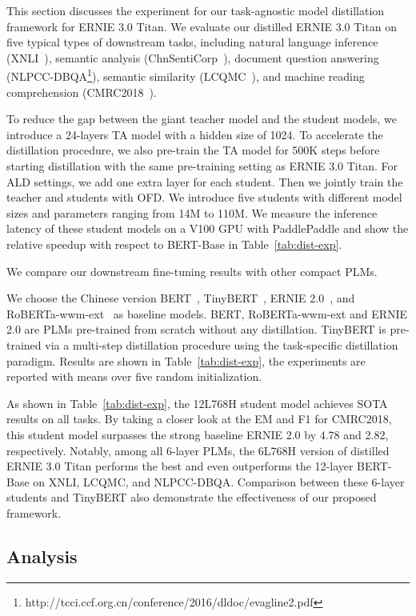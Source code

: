 This section discusses the experiment for our task-agnostic model distillation framework for ERNIE 3.0 Titan. We evaluate our distilled ERNIE 3.0 Titan on five typical types of downstream tasks, including natural language inference (XNLI~\cite{conneau2018xnli}), semantic analysis (ChnSentiCorp~\cite{song6chnsenticorp}), document question answering (NLPCC-DBQA\footnote{http://tcci.ccf.org.cn/conference/2016/dldoc/evagline2.pdf}), semantic similarity (LCQMC~\cite{liu2018lcqmc}), and machine reading comprehension (CMRC2018~\cite{cmrc2018}).

To reduce the gap between the giant teacher model and the student models, we introduce a 24-layers TA model with a hidden size of 1024. To accelerate the distillation procedure, we also pre-train the TA model for 500K steps before starting distillation with the same pre-training setting as ERNIE 3.0 Titan. For ALD settings, we add one extra layer for each student. Then we jointly train the teacher and students with OFD. We introduce five students with different model sizes and parameters ranging from 14M to 110M. We measure the inference latency of these student models on a V100 GPU with PaddlePaddle and show the relative speedup with respect to BERT-Base in Table~\ref{tab:dist-exp}.

We compare our downstream fine-tuning results with other compact PLMs.

We choose the Chinese version BERT~\cite{devlin2018bert}, TinyBERT~\cite{tinybert}, ERNIE 2.0~\cite{sun2020ernie}, and RoBERTa-wwm-ext~\cite{liu2019roberta} as baseline models. BERT, RoBERTa-wwm-ext and ERNIE 2.0 are PLMs pre-trained from scratch without any distillation. TinyBERT is pre-trained via a multi-step distillation procedure using the task-specific distillation paradigm. Results are shown in Table~\ref{tab:dist-exp}, the experiments are reported with means over five random initialization. 

As shown in Table~\ref{tab:dist-exp}, the 12L768H student model achieves SOTA results on all tasks. By taking a closer look at the EM and F1 for CMRC2018, this student model surpasses the strong baseline ERNIE 2.0 by 4.78 and 2.82, respectively. Notably, among all 6-layer PLMs, the 6L768H version of distilled ERNIE 3.0 Titan performs the best and even outperforms the 12-layer BERT-Base on XNLI, LCQMC, and NLPCC-DBQA. Comparison between these 6-layer students and TinyBERT also demonstrate the effectiveness of our proposed framework.

\subsection{Analysis}

